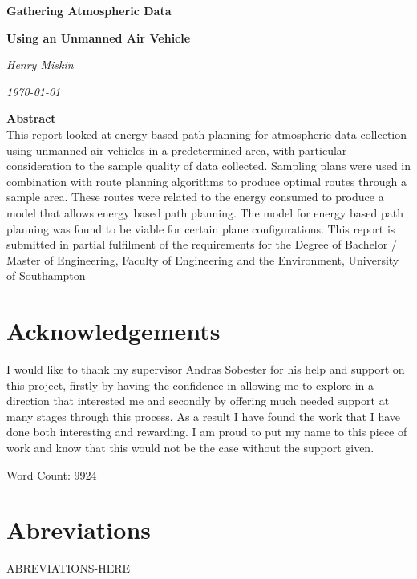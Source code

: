 \documentclass[a4paper,12pt,twoside]{article}
\begin{document}
\onehalfspacing

\begin{titlepage}
\clearpage
\vspace*{\fill}
\begin{center}
\begin{minipage}{.6\textwidth}
\centerline{\textbf{\huge Gathering Atmospheric Data}}
\centerline{\textbf{\large Using an Unmanned Air Vehicle}}
\centerline{\textit{Henry Miskin}}
\centerline{\textit{\today}}
\end{minipage}
\end{center}
\vspace{2em}
\centering
\vfill
\textbf{\large Abstract}
\\
This report looked at energy based path planning for atmospheric data collection using unmanned air vehicles in a predetermined area, with particular consideration to the sample quality of data collected. Sampling plans were used in combination with route planning algorithms to produce optimal routes through a sample area. These routes were related to the energy consumed to produce a model that allows energy based path planning. The model for energy based path planning was found to be viable for certain plane configurations.
\vfill
This report is submitted in partial fulfilment of the requirements for the Degree of Bachelor / Master of Engineering, Faculty of Engineering and the Environment, University of Southampton
\clearpage
\end{titlepage}\vfill
\section*{Acknowledgements}
\label{sec:acknowledgements}

I would like to thank my supervisor Andras Sobester for his help and support on this project, firstly by having the confidence in allowing me to explore in a direction that interested me and secondly by offering much needed support at many stages through this process. As a result I have found the work that I have done both interesting and rewarding. I am proud to put my name to this piece of work and know that this would not be the case without the support given.
\vfill\clearpage
\tableofcontents
\vfill
\begin{center}
Word Count: 9924
\end{center}
\vfill
\clearpage
\listoffigures \clearpage

\section*{Abreviations}
ABREVIATIONS-HERE
\end{document}

